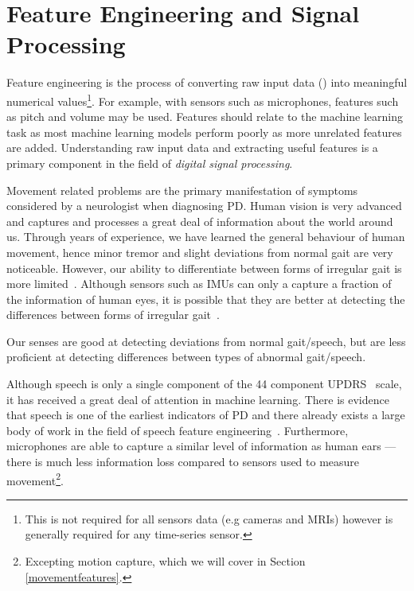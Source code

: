 \documentclass[12pt, twoside]{book}
\renewcommand\emph[1]{\textit{\color{USred}{#1}}}
\begin{document}
\section{Feature Engineering and Signal Processing}
Feature engineering is the process of converting raw input data (\emph{signals}) into meaningful numerical values\footnote{This is not required for all sensors data (e.g cameras and MRIs) however is generally required for any time-series sensor.}. For example, with sensors such as microphones, features such as pitch and volume may be used. Features should relate to the machine learning task as most machine learning models perform poorly as more unrelated features are added. Understanding raw input data and extracting useful features is a primary component in the field of \textit{digital signal processing}. 

Movement related problems are the primary manifestation of symptoms considered by a neurologist when diagnosing PD. Human vision is very advanced and captures and processes a great deal of information about the world around us. Through years of experience, we have learned the general behaviour of human movement, hence minor tremor and slight deviations from normal gait are very noticeable. However, our ability to differentiate between forms of irregular gait is more limited~\cite{parkinsonismdifferential1}. Although sensors such as IMUs can only a capture a fraction of the information of human eyes, it is possible that they are better at detecting the differences between forms of irregular gait~\cite{parkinsonismdifferential2}.

\begin{highlight}
Our senses are good at detecting deviations from normal gait/speech, but are less proficient at detecting differences between types of abnormal gait/speech. 
\end{highlight}

Although speech is only a single component of the 44 component UPDRS~\cite{updrs} scale, it has received a great deal of attention in machine learning. There is evidence that speech is one of the earliest indicators of PD \cite{earlyvowel} and there already exists a large body of work in the field of speech feature engineering~\cite{ostextbook}. Furthermore, microphones are able to capture a similar level of information as human ears --- there is much less information loss compared to sensors used to measure movement\footnote{Excepting motion capture, which we will cover in Section \ref{movementfeatures}.}. 
\end{document}
